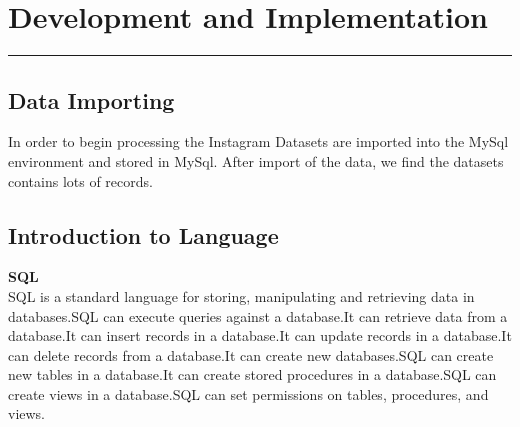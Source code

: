 \chapter{Development and Implementation}\hrule
\label{Chapter:4}
\section{Data Importing}

In order to begin processing the Instagram Datasets are imported into the MySql environment and stored in MySql. After import of the data, we find the datasets contains lots of records. 

\section{Introduction to Language}
\textbf{SQL}
\\
SQL is a standard language for storing, manipulating and retrieving data in databases.SQL can execute queries against a database.It can retrieve data from a database.It can insert records in a database.It can update records in a database.It can delete records from a database.It can create new databases.SQL can create new tables in a database.It can create stored procedures in a database.SQL can create views in a database.SQL can set permissions on tables, procedures, and views.

